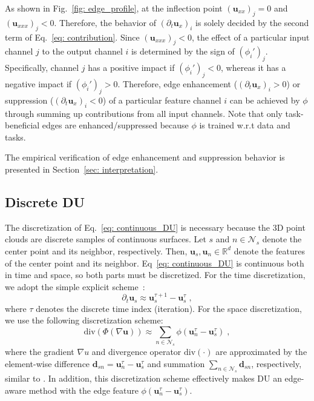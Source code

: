 \documentclass[a4paper,fleqn]{cas-dc}
\begin{document}
As shown in Fig.~\ref{fig: edge_profile}, at the inflection point $(\textbf{u}_{xx})_j = 0$ and $(\textbf{u}_{xxx})_j < 0$. Therefore, the behavior of $(\partial_t \textbf{u}_x)_i$ is solely decided by the second term of Eq.~\eqref{eq: contribution}. Since $(\textbf{u}_{xxx})_j < 0$, the effect of a particular input channel $j$ to the output channel $i$ is determined by the sign of $(\phi_i')_j$. Specifically, channel $j$ has a positive impact if $(\phi_i')_j < 0$, whereas it has a negative impact if $(\phi_i')_j > 0$. Therefore, edge enhancement ($(\partial_t\textbf{u}_x)_i > 0$) or suppression ($(\partial_t\textbf{u}_x)_i < 0$) of a particular feature channel $i$ can be achieved by $\phi$ through summing up contributions from all input channels. Note that only task-beneficial edges are enhanced/suppressed because $\phi$ is trained w.r.t data and tasks.     

The empirical verification of edge enhancement and suppression behavior is presented in Section~\ref{sec: interpretation}. 


\subsection{Discrete DU}
\label{sec:discretization}
The discretization of Eq.~\eqref{eq: continuous_DU} is necessary because the 3D point clouds are discrete samples of continuous surfaces. Let $s$ and $n\in\mathcal{N}_s$ denote the center point and its neighbor, respectively. Then, $\textbf{u}_s, \textbf{u}_n \in \mathbb{R}^d$ denote the features of the center point and its neighbor. Eq~\eqref{eq: continuous_DU} is continuous both in time and space, so both parts must be discretized. For the time discretization, we adopt the simple explicit scheme~\cite{weickert1998anisotropic}: 
\begin{equation}
    \partial_t \textbf{u}_s    
    \approx \textbf{u}_s^{\tau+1} - \textbf{u}_s^\tau \;, 
    \label{eq: time_discretization}
\end{equation}
where $\tau$ denotes the discrete time index (iteration). 
For the space discretization, we use the following discretization scheme:
\begin{equation}
\mathrm{div}\left(\Phi\left(\nabla \textbf{u}\right)\right)
    \approx \sum_{n \in \mathcal{N}_s} \phi\left(\textbf{u}_n^\tau - \textbf{u}_s^\tau \right)\;,
    \label{eq: spatial_discretization}
\end{equation}
where the gradient $\nabla u$ and divergence operator $\mathrm{div(\cdot)}$ are approximated by the element-wise difference $\textbf{d}_{sn}=\textbf{u}_n^\tau - \textbf{u}_s^\tau$ and summation $\sum_{n \in \mathcal{N}_s}\textbf{d}_{sn}$, respectively, similar to \cite{chamberlain2021grand}. In addition, this discretization scheme effectively makes DU an edge-aware method with the edge feature $\phi(\textbf{u}_n^\tau - \textbf{u}_s^\tau)$.   
\end{document}
